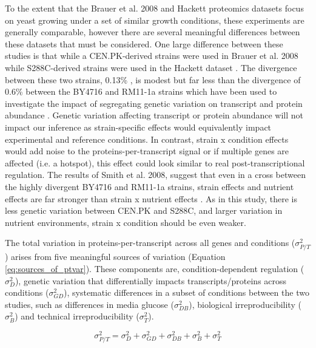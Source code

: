 To the extent that the Brauer et al. 2008 and Hackett proteomics datasets focus on yeast growing under a set of similar growth conditions, these experiments are generally comparable, however there are several meaningful differences between these datasets that must be considered. One large difference between these studies is that while a CEN.PK-derived strains were used in Brauer et al. 2008 \cite{vanDijkenJP:2000er} while S288C-derived strains were used in the Hackett dataset \cite{Winston:1995io}. The divergence between these two strains, 0.13\% \cite{Schacherer:2007ck}, is modest but far less than the divergence of 0.6\% between the BY4716 and RM11-1a strains \cite{Foss:2007ej} which have been used to investigate the impact of segregating genetic variation on transcript and protein abundance \cite{Brem:2005gh, Foss:2007ej}. Genetic variation affecting transcript or protein abundance will not impact our inference as strain-specific effects would equivalently impact experimental and reference conditions. In contrast, strain x condition effects would add noise to the proteins-per-transcript signal or if multiple genes are affected (i.e. a hotspot), this effect could look similar to real post-transcriptional regulation. The results of Smith et al. 2008, suggest that even in a cross between the highly divergent BY4716 and RM11-1a strains, strain effects and nutrient effects are far stronger than strain x nutrient effects \cite{Smith:2008vy}. As in this study, there is less genetic variation between CEN.PK and S288C, and larger variation in nutrient environments, strain x condition should be even weaker.

The total variation in proteins-per-transcript across all genes and conditions ($\sigma^{2}_{P/T}$) arises from five meaningful sources of variation (Equation \ref{eq:sources_of_ptvar}). These components are, condition-dependent regulation ($\sigma^{2}_{D}$), genetic variation that differentially impacts transcripts/proteins across conditions ($\sigma^{2}_{GD}$), systematic differences in a subset of conditions between the two studies, such as differences in media glucose ($\sigma^{2}_{DB}$), biological irreproducibility ($\sigma^{2}_{B}$) and technical irreproducibility ($\sigma^{2}_{T}$).

\begin{equation}
\sigma^{2}_{P/T} = \sigma^{2}_{D} + \sigma^{2}_{GD} + \sigma^{2}_{DB} + \sigma^{2}_{B} + \sigma^{2}_{T}\label{eq:sources_of_ptvar}
\end{equation}

